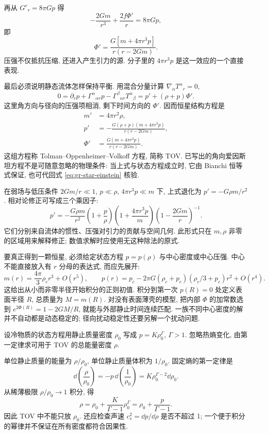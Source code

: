 再从 $G^r{}_r=8\pi Gp$ 得
\[
 -\frac{2Gm}{r^3}+\frac{2f\Phi'}r=8\pi Gp,
\]
即
\begin{equation}
 \Phi'=\frac{G[m+4\pi r^3p]}{r(r-2Gm)}.
 \label{eq:gr-tov-phi}
\end{equation}
压强不仅抵抗压缩, 还进入产生引力的源. 分子里的 $4\pi r^3p$ 是这一效应的一个直接表现.

最后必须说明静态流体怎样保持平衡. 用混合分量计算 $\nabla_\alpha T^\alpha{}_r=0$,
\[
 0=\partial_r p+\Gamma^\alpha{}_{\alpha r}p
                  -\Gamma^\beta{}_{\alpha r}T^\alpha{}_{\beta}
   =p'+(\rho+p)\Phi'.
\]
这里角方向与径向的压强项相消, 剩下时间方向的 $\Phi'$. 因而恒星结构方程是
\begin{equation}
 \begin{aligned}
 m'&=4\pi r^2\rho,\\
 p'&=-\frac{G(\rho+p)(m+4\pi r^3p)}{r(r-2Gm)},\\
 \Phi'&=\frac{G(m+4\pi r^3p)}{r(r-2Gm)}.
 \end{aligned}
 \label{eq:gr-tov}
\end{equation}
这组方程称 Tolman--Oppenheimer--Volkoff 方程, 简称 TOV. 已写出的角向爱因斯坦方程不是可随意忽略的物理条件: 当上式与状态方程成立时, 它由 Bianchi 恒等式保证, 也可代回式 \eqref{eq:gr-star-einstein} 核验.

在弱场与低压条件 $2Gm/r\ll1$, $p\ll\rho$, $4\pi r^3p\ll m$ 下, 上式退化为 $p'=-G\rho m/r^2$. 相对论修正可写成三个乘因子:
\[
 p'=-\frac{G\rho m}{r^2}
       \left(1+\frac p\rho\right)
       \left(1+\frac{4\pi r^3p}m\right)
       \left(1-\frac{2Gm}r\right)^{-1}.
\]
它们分别来自流体的惯性、压强对引力的贡献与空间几何. 此形式只在 $m,\rho$ 非零的区域用来解释修正; 数值求解时应使用无这种除法的原式.

要真正得到一颗恒星, 必须给定状态方程 $p=p(\rho)$ 与中心密度或中心压强. 中心不能直接放入有 $r$ 分母的表达式, 而应先展开:
\begin{equation}
 m(r)=\frac{4\pi}3\rho_c r^3+O(r^5),\qquad
 p(r)=p_c-2\pi G(\rho_c+p_c)(\rho_c/3+p_c)r^2+O(r^4).
 \label{eq:gr-tov-center}
\end{equation}
这给出从小而非零半径开始积分的正则初值. 积分到第一次 $p(R)=0$ 处定义表面半径 $R$, 总质量为 $M=m(R)$. 对没有表面薄壳的模型, 把内部 $\Phi$ 的加常数选到 $e^{2\Phi(R)}=1-2GM/R$, 就能与外部静止时间连续匹配. 一族不同中心密度的解并不自动都是动态稳定的; 径向扰动稳定性还要另解一个扰动问题.

\begin{example}
 设冷物质的状态方程用静止质量密度 $\rho_0$ 写成 $p=K\rho_0^\Gamma$, $\Gamma>1$. 忽略热熵变化, 由第一定律求可用于 TOV 的总能量密度 $\rho$.
\end{example}
\begin{solution}
 单位静止质量的能量为 $\rho/\rho_0$, 单位静止质量体积为 $1/\rho_0$. 固定熵的第一定律是
 \[
 \dd\left(\frac\rho{\rho_0}\right)
   =-p\,\dd\left(\frac1{\rho_0}\right)
   =K\rho_0^{\Gamma-2}\dd\rho_0.
 \]
 从稀薄极限 $\rho/\rho_0\to1$ 积分, 得
 \[
 \rho=\rho_0+\frac K{\Gamma-1}\rho_0^\Gamma
      =\rho_0+\frac p{\Gamma-1}.
 \]
 因此 TOV 中不能只放 $\rho_0$. 还应检查声速 $c_s^2=\dd p/\dd\rho$ 是否不超过 1; 一个便于积分的幂律并不保证在所有密度都符合因果性.
\end{solution}

